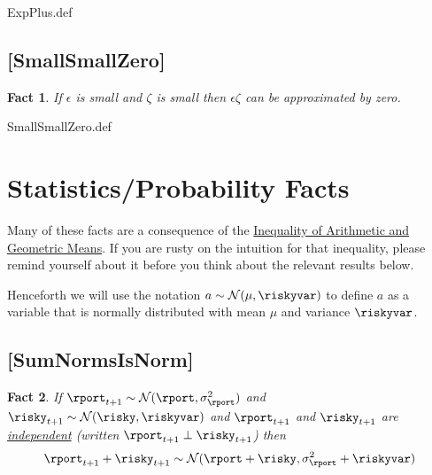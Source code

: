 \message{ !name(MathFactsList.tex)}\documentclass{handout}
\newtheorem{Fact}{Fact}
\begin{document}
\begin{verbatimwrite}{ExpPlus.def}
\providecommand{\ExpPlus}{\href{https://www.econ2.jhu.edu/people/ccarroll/public/LectureNotes/MathFacts/MathFactsList\#ExpPlus}{\ensuremath{\mathtt{[ExpPlus]}}}}
\end{verbatimwrite}

\hypertarget{SmallSmallZero}{}
\subsection{[SmallSmallZero]}\label{fact:SmallSmallZero}

\begin{Fact} If $\epsilon$ is small and $\zeta$ is small then $\epsilon\zeta$ can be 
approximated by zero.
\end{Fact}

\begin{verbatimwrite}{SmallSmallZero.def}
\providecommand{\SmallSmallZero}{\href{https://www.econ2.jhu.edu/people/ccarroll/public/LectureNotes/MathFacts/MathFactsList\#SmallSmallZero}{\ensuremath{\mathtt{[SmallSmallZero]}}}}
\end{verbatimwrite}



\section{Statistics/Probability Facts}

Many of these facts are a consequence of the \href{https://en.wikipedia.org/wiki/Inequality_of_arithmetic_and_geometric_means}{Inequality of Arithmetic and Geometric Means}.  If you are rusty on the intuition for that inequality, please remind yourself about it before you think about the relevant results below.

Henceforth we will use the notation $a \sim \mathcal{N}(\mu,\riskyvar)$ to define $a$ as a variable that is normally distributed with mean $\mu$ and variance $\riskyvar$.

\hypertarget{SumNormsIsNorm}{}
\subsection{[SumNormsIsNorm]}

\begin{Fact} If $\rport_{t+1} \sim \mathcal{N}(\rport,\sigma^{2}_{\rport})$ and $\risky_{t+1} \sim \mathcal{N}(\risky,\riskyvar)$ and $\rport_{t+1}$ and $\risky_{t+1}$ are \href{http://en.wikipedia.org/wiki/Independence_(probability_theory)}{independent} (written $\rport_{t+1} \perp \risky_{t+1}$) then
\begin{equation}
        \rport_{t+1}+\risky_{t+1} \sim \mathcal{N}(\rport+\risky,\sigma^{2}_{\rport}+\riskyvar) \label{eq:SumNormsIsNorm}
\end{equation}
\end{Fact}
\end{document}
